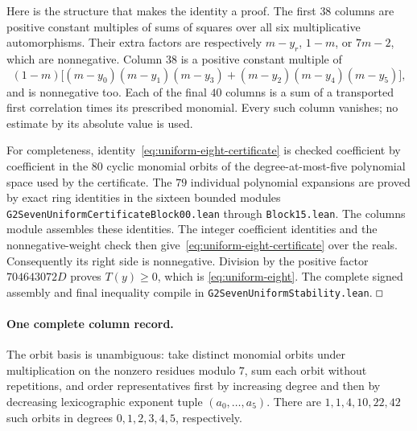 \documentclass[11pt]{article}
\renewcommand{\square}{\mathord{\vcenter{\hrule\hbox{\vrule height .45em\kern .45em\vrule}\hrule}}}
\begin{document}
Here is the structure that makes the identity a proof.
The first \(38\) columns are positive constant multiples of sums of
squares over all six multiplicative automorphisms. Their extra factors
are respectively \(m-y_r\), \(1-m\), or \(7m-2\), which are nonnegative.
Column \(38\) is a positive constant multiple of
\[
 (1-m)\bigl[
 (m-y_0)(m-y_1)(m-y_3)
 +(m-y_2)(m-y_4)(m-y_5)\bigr],
\]
and is nonnegative too. Each of the final \(40\) columns is a sum
of a transported first correlation times its prescribed monomial.
Every such column vanishes; no estimate by its absolute value is used.

For completeness, identity~\eqref{eq:uniform-eight-certificate}
is checked coefficient by coefficient in the \(80\) cyclic monomial
orbits of the degree-at-most-five polynomial space used by the
certificate. The \(79\) individual polynomial expansions are proved
by exact ring identities in the sixteen bounded modules
\texttt{G2SevenUniformCertificateBlock00.lean} through
\texttt{Block15.lean}. The columns module assembles these identities.
The integer coefficient identities and the nonnegative-weight check
then give~\eqref{eq:uniform-eight-certificate} over the reals.
Consequently its right side is nonnegative. Division by the positive
factor \(704643072D\) proves \(T(y)\ge0\), which is
\eqref{eq:uniform-eight}. The complete signed assembly and final
inequality compile in \texttt{G2SevenUniformStability.lean}.
\(\square\)

\paragraph{One complete column record.}
The orbit basis is unambiguous: take distinct monomial orbits under
multiplication on the nonzero residues modulo \(7\), sum each orbit
without repetitions, and order representatives first by increasing
degree and then by decreasing lexicographic exponent tuple
\((a_0,\ldots,a_5)\). There are \(1,1,4,10,22,42\) such orbits in
degrees \(0,1,2,3,4,5\), respectively.
\end{document}
